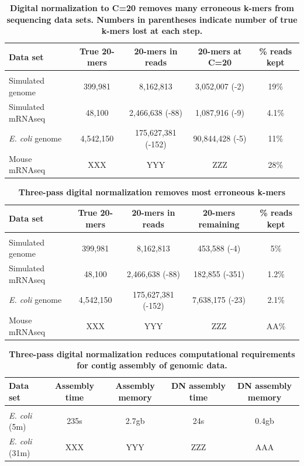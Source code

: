 \documentclass[10pt]{article}
\begin{document}
\begin{table}[!ht]
\caption{
\bf{Digital normalization to C=20 removes many erroneous k-mers from sequencing data sets.  Numbers
in parentheses indicate number of true k-mers lost at each step.}}
\begin{tabular}{|l|c|c|c|c|}
Data set & True 20-mers & 20-mers in reads & 20-mers at C=20 & \% reads kept\\
\hline \\
Simulated genome & 399,981 & 8,162,813 & 3,052,007 (-2) & 19\% \\
Simulated mRNAseq & 48,100 & 2,466,638 (-88) & 1,087,916 (-9) & 4.1\% \\
{\em E. coli} genome & 4,542,150 & 175,627,381 (-152) & 90,844,428 (-5) & 11\% \\
Mouse mRNAseq & XXX & YYY & ZZZ & 28\% \\

\end{tabular}
\begin{flushleft}
\end{flushleft}
\label{tab:normC20}
\end{table}


\begin{table}[!ht]
\caption{
\bf{Three-pass digital normalization removes most erroneous k-mers}}
\begin{tabular}{|l|c|c|c|c|}
Data set & True 20-mers & 20-mers in reads & 20-mers remaining & \% reads kept\\
\hline \\
Simulated genome & 399,981 & 8,162,813 & 453,588 (-4) & 5\% \\
Simulated mRNAseq & 48,100 & 2,466,638 (-88) & 182,855 (-351) & 1.2\% \\
{\em E. coli} genome & 4,542,150 & 175,627,381 (-152) & 7,638,175 (-23) & 2.1\% \\
Mouse mRNAseq & XXX & YYY & ZZZ & AA\% \\
\end{tabular}
\begin{flushleft}
\end{flushleft}
\label{tab:normC5}
\end{table}


\begin{table}[!ht]
\caption{
\bf{Three-pass digital normalization reduces computational requirements for contig assembly of genomic data.}}
\begin{tabular}{|l|c|c|c|c|}

Data set & Assembly time & Assembly memory & DN assembly time & DN assembly memory \\
\hline \\
{\em E. coli} (5m) & 235s & 2.7gb & 24s & 0.4gb \\
{\em E. coli} (31m) & XXX & YYY & ZZZ & AAA \\

\end{tabular}
\begin{flushleft}
\end{flushleft}
\label{tab:dngenome}
\end{table}
\end{document}
